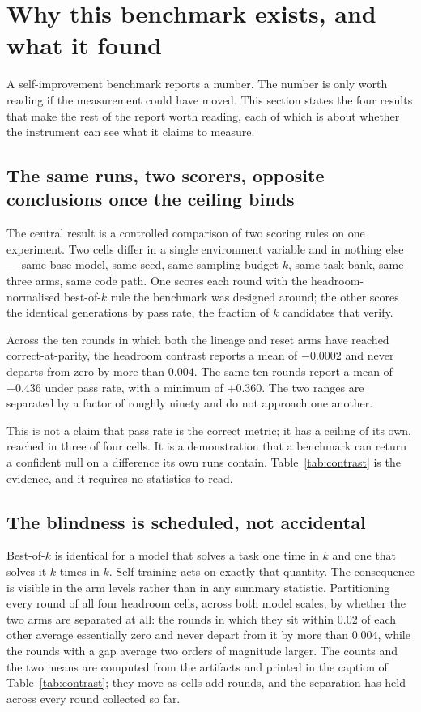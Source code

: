 \section{Why this benchmark exists, and what it found}
\label{sec:motivation}

A self-improvement benchmark reports a number. The number is only worth reading if the
measurement could have moved. This section states the four results that make the rest of the
report worth reading, each of which is about whether the instrument can see what it claims to
measure.

\subsection{The same runs, two scorers, opposite conclusions once the ceiling binds}
\label{sec:motivation:contrast}

The central result is a controlled comparison of two scoring rules on one experiment. Two cells
differ in a single environment variable and in nothing else --- same base model, same seed, same
sampling budget $k$, same task bank, same three arms, same code path. One scores each round with
the headroom-normalised best-of-$k$ rule the benchmark was designed around; the other scores the
identical generations by pass rate, the fraction of $k$ candidates that verify.

Across the ten rounds in which both the lineage and reset arms have reached correct-at-parity,
the headroom contrast reports a mean of $-0.0002$ and never departs from zero by more than
$0.004$. The same ten rounds report a mean of $+0.436$ under pass rate, with a minimum of
$+0.360$. The two ranges are separated by a factor of roughly ninety and do not approach one
another.

This is not a claim that pass rate is the correct metric; it has a ceiling of its own, reached in
three of four cells. It is a demonstration that a benchmark can return a confident null on a
difference its own runs contain. Table~\ref{tab:contrast} is the evidence, and it requires no
statistics to read.

\subsection{The blindness is scheduled, not accidental}

Best-of-$k$ is identical for a model that solves a task one time in $k$ and one that solves it
$k$ times in $k$. Self-training acts on exactly that quantity. The consequence is visible in the
arm levels rather than in any summary statistic. Partitioning every round of all four headroom
cells, across both model scales, by whether the two arms are separated at all: the rounds in
which they sit within $0.02$ of each other average essentially zero and never depart from it by
more than $0.004$, while the rounds with a gap average two orders of magnitude larger. The
counts and the two means are computed from the artifacts and printed in the caption of
Table~\ref{tab:contrast}; they move as cells add rounds, and the separation has held across
every round collected so far.

